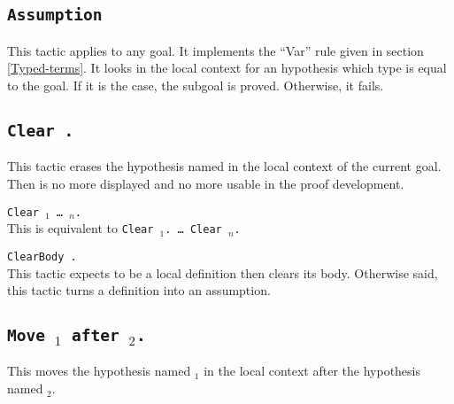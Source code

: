 \subsection{{\tt Assumption}}
This tactic applies to any goal. It implements the
``Var'' rule given in section
\ref{Typed-terms}. It looks in the local context for an hypothesis
which type is equal to the goal.  If it is the case, the subgoal is
proved. Otherwise, it fails.

\begin{ErrMsgs}
\item  {}
\end{ErrMsgs}

\subsection{\tt Clear {\ident}.}\label{Clear}
This tactic erases the hypothesis named {\ident} in the local context
of the current goal. Then {\ident} is no more displayed and no more
usable in the proof development.

\begin{Variants}
\item {\tt Clear {\ident$_1$} {\ldots} {\ident$_n$}.}\\
This is equivalent to {\tt Clear {\ident$_1$}. {\ldots} Clear {\ident$_n$}.}

\item {\tt ClearBody {\ident}.}\\
This tactic expects {\ident} to be a local definition then clears its
body. Otherwise said, this tactic turns a definition into an assumption.
\end{Variants}

\begin{ErrMsgs}
\item {}
\item {}
\item {}
\end{ErrMsgs}

\subsection{\tt Move {\ident$_1$} after {\ident$_2$}.}
This moves the hypothesis named {\ident$_1$} in the local context
after the hypothesis named {\ident$_2$}.


